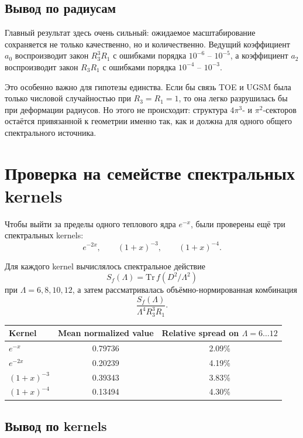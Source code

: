 \documentclass[12pt,a4paper]{article}
\begin{document}
\subsection{Вывод по радиусам}

Главный результат здесь очень сильный: ожидаемое масштабирование сохраняется не только качественно, но и количественно. Ведущий коэффициент \(a_0\) воспроизводит закон \(R_3^3R_1\) с ошибками порядка \(10^{-6}\) -- \(10^{-5}\), а коэффициент \(a_2\) воспроизводит закон \(R_3R_1\) с ошибками порядка \(10^{-4}\) -- \(10^{-3}\).

Это особенно важно для гипотезы единства. Если бы связь TOE и UGSM была только числовой случайностью при \(R_3=R_1=1\), то она легко разрушилась бы при деформации радиусов. Но этого не происходит: структура \(4\pi^3\)- и \(\pi^2\)-секторов остаётся привязанной к геометрии именно так, как и должна для одного общего спектрального источника.

\section{Проверка на семействе спектральных kernels}

Чтобы выйти за пределы одного теплового ядра \(e^{-x}\), были проверены ещё три спектральных kernels:
\[
e^{-2x},\qquad (1+x)^{-3},\qquad (1+x)^{-4}.
\]

Для каждого kernel вычислялось спектральное действие
\[
S_f(\Lambda)=\mathrm{Tr}\, f(D^2/\Lambda^2)
\]
при \(\Lambda=6,8,10,12\), а затем рассматривалась объёмно-нормированная комбинация
\[
\frac{S_f(\Lambda)}{\Lambda^4 R_3^3R_1}.
\]

\begin{center}
\begin{tabular}{lcc}
\toprule
Kernel & Mean normalized value & Relative spread on $\Lambda=6\ldots 12$ \\
\midrule
$e^{-x}$ & 0.79736 & 2.09\% \\
$e^{-2x}$ & 0.20239 & 4.19\% \\
$(1+x)^{-3}$ & 0.39343 & 3.83\% \\
$(1+x)^{-4}$ & 0.13494 & 4.30\% \\
\bottomrule
\end{tabular}
\end{center}

\subsection{Вывод по kernels}
\end{document}
